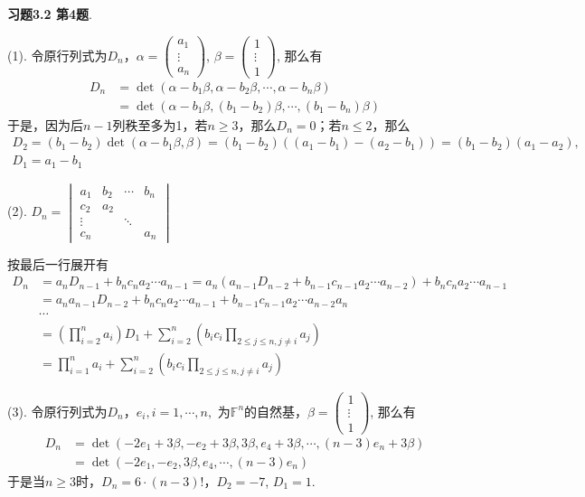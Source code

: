 \newpageorvspace

{\bf 习题3.2 第4题}.

(1). 令原行列式为$D_n$，$\alpha = \begin{pmatrix} a_1 \\ \vdots \\ a_n \end{pmatrix}$, $\beta = \begin{pmatrix} 1 \\ \vdots \\ 1 \end{pmatrix}$, 那么有
\begin{align*}
D_n & = \det (\alpha-b_1\beta, \alpha-b_2\beta, \cdots, \alpha-b_n\beta) \\
& = \det (\alpha-b_1\beta, (b_1-b_2)\beta, \cdots, (b_1-b_n)\beta)
\end{align*}
于是，因为后$n-1$列秩至多为1，若$n \geqslant 3$，那么$D_n = 0$；若$n \leqslant 2$，那么
\begin{gather*}
    D_2 = (b_1-b_2) \det (\alpha-b_1\beta, \beta) = (b_1-b_2)((a_1-b_1)-(a_2-b_1)) = (b_1-b_2)(a_1-a_2), \\
    D_1 = a_1-b_1
\end{gather*}

(2). $D_n = \begin{vmatrix}
a_1 & b_2 & \cdots & b_n \\ c_2 & a_2 & & \\ \vdots & & \ddots & \\ c_n & & & a_n
\end{vmatrix}$

按最后一行展开有
\begin{align*}
D_n & = a_nD_{n-1} + b_nc_na_2\cdots a_{n-1} = a_n(a_{n-1}D_{n-2} + b_{n-1}c_{n-1}a_2\cdots a_{n-2}) + b_nc_na_2\cdots a_{n-1} \\
& = a_na_{n-1}D_{n-2} + b_nc_na_2\cdots a_{n-1} + b_{n-1}c_{n-1}a_2\cdots a_{n-2}a_n \\
& \cdots \\
& = \left( \prod_{i=2}^n a_i \right) D_1 + \sum_{i=2}^n \left( b_ic_i \prod_{2 \leqslant j \leqslant n, j \neq i} a_j \right) \\
& = \prod_{i=1}^n a_i + \sum_{i=2}^n \left( b_ic_i \prod_{2 \leqslant j \leqslant n, j \neq i} a_j \right)
\end{align*}

(3). 令原行列式为$D_n$，$e_i, i=1,\cdots,n,$ 为$\mathbb{F}^n$的自然基，$\beta = \begin{pmatrix} 1 \\ \vdots \\ 1 \end{pmatrix}$, 那么有
\begin{align*}
D_n & = \det (-2e_1+3\beta, -e_2+3\beta, 3\beta, e_4+3\beta, \cdots, (n-3)e_n+3\beta) \\
& = \det (-2e_1, -e_2, 3\beta, e_4, \cdots, (n-3)e_n)
\end{align*}
于是当$n \geqslant 3$时，$D_n = 6 \cdot (n-3)!$，$D_2 = -7$, $D_1 = 1$.

